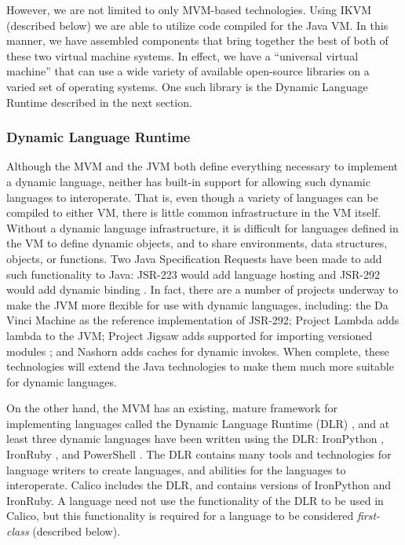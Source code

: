 \documentclass[preprint]{sigplanconf}
\begin{document}
However, we are not limited to only MVM-based technologies. Using IKVM
(described below) we are able to utilize code compiled for the Java
VM. In this manner, we have assembled components that bring together
the best of both of these two virtual machine systems. In effect, we
have a ``universal virtual machine'' that can use a wide variety of
available open-source libraries on a varied set of operating
systems. One such library is the Dynamic Language Runtime described in
the next section.

\subsubsection{Dynamic Language Runtime}

Although the MVM and the JVM both define everything necessary to
implement a dynamic language, neither has built-in support for
allowing such dynamic languages to interoperate. That is, even though
a variety of languages can be compiled to either VM, there is little
common infrastructure in the VM itself. Without a dynamic language
infrastructure, it is difficult for languages defined in the VM to
define dynamic objects, and to share environments, data structures,
objects, or functions. Two Java Specification Requests have been made
to add such functionality to Java: JSR-223 would add language hosting
and JSR-292 would add dynamic binding \cite{wu-2010}. In fact, there are a
number of projects underway to make the JVM more flexible for use with
dynamic languages, including: the Da Vinci Machine \cite{java-davinci}
as the reference implementation of JSR-292; Project Lambda
\cite{java-lambda} adds lambda to the JVM; Project Jigsaw adds
supported for importing versioned modules \cite{java-jigsaw}; and
Nashorn \cite{java-nashorn} adds caches for dynamic invokes. When
complete, these technologies will extend the Java technologies to make
them much more suitable for dynamic languages.

On the other hand, the MVM has an existing, mature framework for
implementing languages called the Dynamic Language Runtime (DLR)
\cite{dlr-microsoft}, and at least three dynamic languages have been
written using the DLR: IronPython \cite{ironpython}, IronRuby
\cite{ironruby}, and PowerShell \cite{powershell}. The DLR contains
many tools and technologies for language writers to create languages,
and abilities for the languages to interoperate. Calico includes the
DLR, and contains versions of IronPython and IronRuby. A language need
not use the functionality of the DLR to be used in Calico, but this
functionality is required for a language to be considered
\textit{first-class} (described below).
\end{document}
